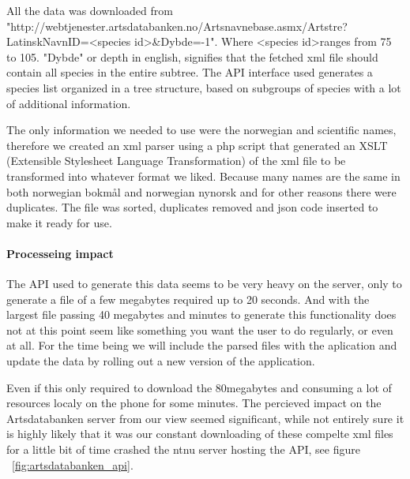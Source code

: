 	All the data was downloaded from
\newline"http://webtjenester.artsdatabanken.no/Artsnavnebase.asmx/Artstre? \newline LatinskNavnID=\textless species id\textgreater\&Dybde=-1".
	Where \textless species id\textgreater ranges from 75 to 105. "Dybde" or depth in english, signifies that the fetched xml file should contain all species in the entire subtree.
	The API interface used generates a species list organized in a tree structure, based on subgroups of species with a lot of additional information.

	The only information we needed to use were the norwegian and scientific names, therefore we created an xml parser using a php script that generated an XSLT (Extensible Stylesheet Language Transformation\cite{w3:xslt}) of the xml file to be transformed into whatever format we liked.
	Because many names are the same in both norwegian bokmål and norwegian nynorsk and for other reasons there were duplicates.
	The file was sorted, duplicates removed and json code inserted to make it ready for use.

	\paragraph{Processeing impact}
	The API used to generate this data seems to be very heavy on the server, only to generate a file of a few megabytes required up to 20 seconds. 
	And with the largest file passing 40 megabytes and minutes to generate this functionality does not at this point seem like something you want the user to do regularly, or even at all. 
	For the time being we will include the parsed files with the aplication and update the data by rolling out a new version of the application.

	Even if this only required to download the 80megabytes and consuming a lot of resources localy on the phone for some minutes. 
	The percieved impact on the Artsdatabanken server from our view seemed significant, while not entirely sure it is highly likely that it was our constant downloading of these compelte xml files for a little bit of time crashed the ntnu server hosting the API, see figure ~\ref{fig:artsdatabanken_api}.

